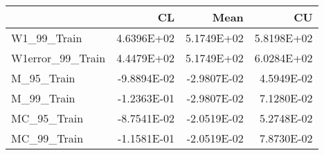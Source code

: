 \begin{tabular}{lrrr}
\toprule
{} &          CL &        Mean &         CU \\
\midrule
W1\_99\_Train      &  4.6396E+02 &  5.1749E+02 & 5.8198E+02 \\
W1error\_99\_Train &  4.4479E+02 &  5.1749E+02 & 6.0284E+02 \\
M\_95\_Train       & -9.8894E-02 & -2.9807E-02 & 4.5949E-02 \\
M\_99\_Train       & -1.2363E-01 & -2.9807E-02 & 7.1280E-02 \\
MC\_95\_Train      & -8.7541E-02 & -2.0519E-02 & 5.2748E-02 \\
MC\_99\_Train      & -1.1581E-01 & -2.0519E-02 & 7.8730E-02 \\
\bottomrule
\end{tabular}
